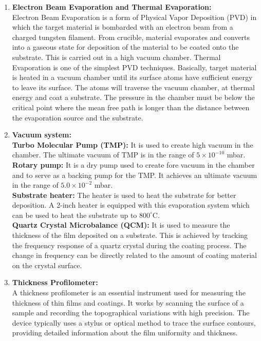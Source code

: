 \documentclass[]{report}[12 pt]
\begin{document}
	\begin{enumerate}
		\item  \textbf{Electron Beam Evaporation and Thermal Evaporation:}\\
		Electron Beam Evaporation is a 	form of Physical Vapor Deposition (PVD) in which the target material is bombarded with an electron beam from a charged tungsten filament. From crucible, material evaporates and converts into a gaseous state for deposition of the material to be coated onto the substrate. This is carried out in a high vacuum chamber. Thermal Evaporation is one of the simplest PVD techniques. Basically, target material is heated in a vacuum chamber until its surface
		atoms have sufficient energy to leave its surface. The atoms will traverse the vacuum
		chamber, at thermal energy and coat a substrate. The pressure in the chamber must be below
		the critical point where the mean free path is longer than the distance between the
		evaporation source and the substrate.
		\item \textbf{Vacuum system:}\\
		\textbf{Turbo Molecular Pump (TMP):} It is used to create high vacuum in the
		chamber. The ultimate vacuum of TMP is in the range of $5 \times 10 ^{-10}$ mbar. \\
		\textbf{Rotary pump:} It is a dry pump used to create fore vacuum in the chamber and to serve as a backing pump for the TMP. It achieves an ultimate vacuum in the range of $5.0 \times 10^{-2}$ mbar.\\ 
		\textbf{Substrate heater: }The heater is used to heat the substrate for better deposition. A 2-inch heater is equipped with this 	evaporation system which can be used to heat the substrate up to $800^{\circ}$C.\\ 
		\textbf{Quartz Crystal Microbalance (QCM): }It is used to measure the thickness of the film deposited on a substrate. This is achieved by tracking the frequency response of a quartz crystal during the coating
		process. The change in frequency can be directly related to the amount of coating material on
		the crystal surface.
		\item \textbf{Thickness Profilometer:}\\
		A thickness profilometer is an essential instrument used for
		measuring the thickness of thin films and coatings. It works by scanning the surface of a
		sample and recording the topographical variations with high precision. The device typically uses a stylus or optical method to trace the surface contours, providing detailed information 	about the film uniformity and thickness.
		
	\end{enumerate}
\end{document}
